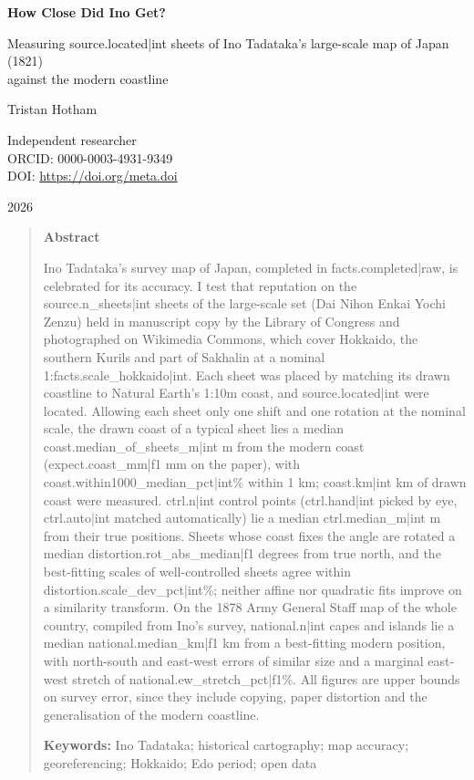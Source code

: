 \documentclass[11pt,a4paper]{article}
\begin{document}
\begin{center}
{\Large\bfseries How Close Did Ino Get?\par}
\vspace{0.4em}
{\large Measuring {{source.located|int}} sheets of Ino Tadataka's large-scale map of Japan (1821)\\against the modern coastline\par}
\vspace{1.2em}
{\large Tristan Hotham\par}
\vspace{0.3em}
{\small Independent researcher\\
ORCID: 0000-0003-4931-9349\\
DOI: \href{https://doi.org/{{meta.doi}}}{https://doi.org/{{meta.doi}}}\par}
\vspace{0.8em}
2026
\end{center}

\begin{quote}
\small
\begin{center}\textbf{Abstract}\end{center}
Ino Tadataka's survey map of Japan, completed in {{facts.completed|raw}}, is celebrated for its accuracy. I test that reputation on the {{source.n_sheets|int}} sheets of the large-scale set (Dai Nihon Enkai Yochi Zenzu) held in manuscript copy by the Library of Congress and photographed on Wikimedia Commons, which cover Hokkaido, the southern Kurils and part of Sakhalin at a nominal 1:{{facts.scale_hokkaido|int}}. Each sheet was placed by matching its drawn coastline to Natural Earth's 1:10m coast, and {{source.located|int}} were located. Allowing each sheet only one shift and one rotation at the nominal scale, the drawn coast of a typical sheet lies a median {{coast.median_of_sheets_m|int}} m from the modern coast ({{expect.coast_mm|f1}} mm on the paper), with {{coast.within1000_median_pct|int}}\% within 1 km; {{coast.km|int}} km of drawn coast were measured. {{ctrl.n|int}} control points ({{ctrl.hand|int}} picked by eye, {{ctrl.auto|int}} matched automatically) lie a median {{ctrl.median_m|int}} m from their true positions. Sheets whose coast fixes the angle are rotated a median {{distortion.rot_abs_median|f1}} degrees from true north, and the best-fitting scales of well-controlled sheets agree within {{distortion.scale_dev_pct|int}}\%; neither affine nor quadratic fits improve on a similarity transform. On the 1878 Army General Staff map of the whole country, compiled from Ino's survey, {{national.n|int}} capes and islands lie a median {{national.median_km|f1}} km from a best-fitting modern position, with north-south and east-west errors of similar size and a marginal east-west stretch of {{national.ew_stretch_pct|f1}}\%. All figures are upper bounds on survey error, since they include copying, paper distortion and the generalisation of the modern coastline.

\textbf{Keywords:} Ino Tadataka; historical cartography; map accuracy; georeferencing; Hokkaido; Edo period; open data
\end{quote}
\end{document}
